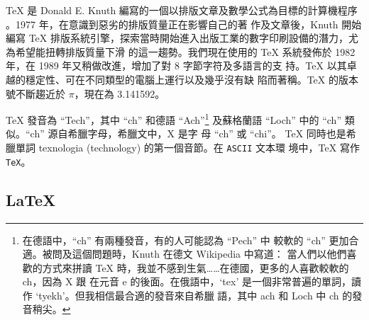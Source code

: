\TeX{} 是 Donald E.
Knuth 編寫的一個以排版文章及數學公式為目標的計算機程序 \cite{texbook}。1977 年，在意識到惡劣的排版質量正在影響自己的著
作及文章後，Knuth 開始編寫 \TeX{} 排版系統引擎，探索當時開始進入出版工業的數字印刷設備的潛力，尤為希望能扭轉排版質量下滑
的這一趨勢。我們現在使用的 \TeX{} 系統發佈於 1982 年，在 1989 年又稍做改進，增加了對 8 字節字符及多語言的支
持。\TeX{} 以其卓越的穩定性、可在不同類型的電腦上運行以及幾乎沒有缺
陷而著稱。\TeX{} 的版本號不斷趨近於 $\pi$，現在為 3.141592。


\TeX{} 發音為 ``Tech''，其中 ``ch'' 和德語 ``Ach''\footnote{在德語中，``ch'' 有兩種發音，有的人可能認為 ``Pech'' 中
較軟的 ``ch'' 更加合適。被問及這個問題時，Knuth 在德文 Wikipedia 中寫道：{
當人們以他們喜歡的方式來拼讀 \TeX{} 時，我並不感到生氣……在德國，更多的人喜歡較軟的 ch，因為 X 跟
在元音 e 的後面。在俄語中，`tex' 是一個非常普遍的單詞，讀作 `tyekh'。但我相信最合適的發音來自希臘
語，其中 ach 和 Loch 中 ch 的發音稍尖。}} 及蘇格蘭語 ``Loch'' 中的 ``ch'' 類似。``ch'' 源自希臘字母，希臘文中，X 是字
母 ``ch'' 或 ``chi''。 \TeX{} 同時也是希臘單詞 texnologia (technology) 的第一個音節。在 \texttt{ASCII} 文本環
境中，\TeX{} 寫作 \texttt{TeX}。


\subsection{\LaTeX}


